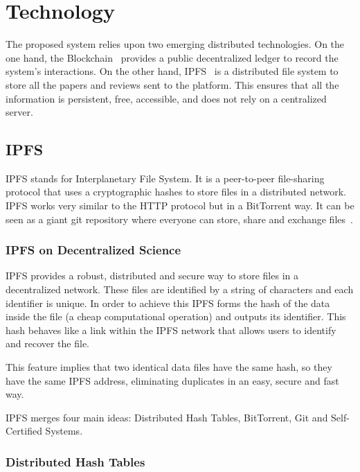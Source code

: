 \section{Technology}
\label{tech}

The proposed system relies upon two emerging distributed technologies. On the
one hand, the Blockchain~\cite{buterin2014ethereum} provides a public
decentralized ledger to record the system's interactions. On the other hand,
IPFS~\cite{benet_ipfs-content_2014} is a distributed file system to store all
the papers and reviews sent to the platform. This ensures that all the
information is persistent, free, accessible, and does not rely on a centralized
server.

\subsection{IPFS}
\label{tech:sec:ipfs}

IPFS stands for Interplanetary File System. It is a peer-to-peer file-sharing
protocol that uses a cryptographic hashes to store files in a distributed
network. IPFS works very similar to the HTTP protocol but in a BitTorrent way.
It can be seen as a giant git repository where everyone can store, share and
exchange files~\cite{benet2014ipfs}.

\subsubsection*{IPFS on Decentralized Science}

IPFS provides a robust, distributed and secure way to store files in a
decentralized network. These files are identified by a string of characters and
each identifier is unique. In order to achieve this IPFS forms the hash of the
data inside the file (a cheap computational operation) and outputs its
identifier. This hash behaves like a link within the IPFS network that allows
users to identify and recover the file.

This feature implies that two identical data files have the same hash, so they
have the same IPFS address, eliminating duplicates in an easy, secure and fast
way.

IPFS merges four main ideas: Distributed Hash Tables, BitTorrent, Git and
Self-Certified Systems.

\subsubsection*{Distributed Hash Tables}
\label{tech:sec:ipfs:dht}

